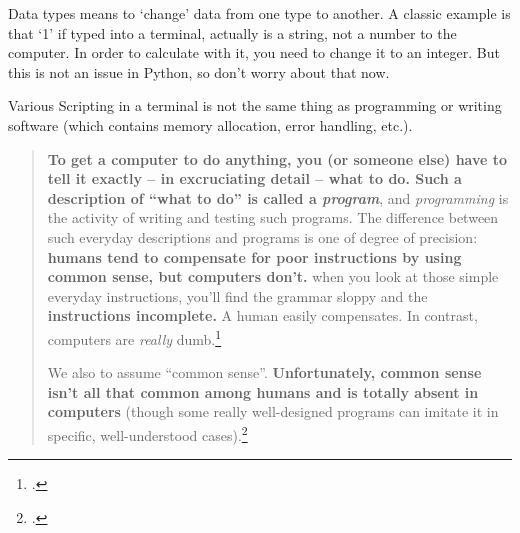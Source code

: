 \documentclass[10pt,a4paper]{article}
\begin{document}
\begin{multicols}{3}
\begin{textbox}{Data types}
 means to `change' data from one type to another. A classic example is that `1' if typed into a terminal, actually is a string, not a number to the computer. In order to calculate with it, you need to change it to an integer. But this is not an issue in Python, so don't worry about that now.
\end{textbox}

\begin{textbox}{Various}
 Scripting in a terminal is not the same thing as programming or writing software (which contains memory allocation, error handling, etc.). 

\begin{quote}\tiny
    \textbf{To get a computer to do anything, you (or someone else) have to tell it exactly -- in excruciating detail -- what to do. Such a description of ``what to do'' is called a \emph{program}}, and \emph{programming} is the activity of writing and testing such programs.
    \punkti The difference between such \lbrack{}everyday\rbrack{} descriptions and programs is one of degree of precision: \textbf{humans tend to compensate for poor instructions by using common sense, but computers don't.}
    \punkti when you look at those simple \lbrack{}everyday\rbrack{} instructions, you'll find the grammar sloppy and the \textbf{instructions incomplete.} A human easily compensates. \punkti In contrast, computers are \emph{really} dumb.\footcite[][44. Hervorhebung hinzugefügt.]{stroustrup}
    
    We also \punkti to assume ``common sense''. \textbf{Unfortunately, common sense isn't all that common among humans and is totally absent in computers} (though some really well-designed programs can imitate it in specific, well-understood cases).\footcite[35. Emphasis added.]{stroustrup}
\end{quote}
\end{textbox}


\end{multicols}
\end{document}
